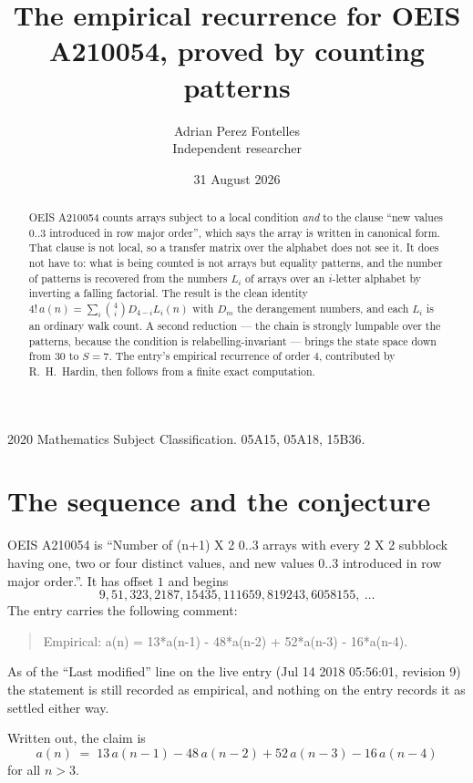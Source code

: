 \documentclass[11pt,a4paper]{article}
\title{The empirical recurrence for OEIS A210054, proved by counting patterns}
\author{Adrian Perez Fontelles\\ \small Independent researcher}
\date{31 August 2026}
\theoremstyle{plain}
\theoremstyle{definition}
\begin{document}
\maketitle

\begin{abstract}
OEIS A210054 counts arrays subject to a local condition \emph{and} to the clause ``new values
$0..3$ introduced in row major order'', which says the array is written in canonical
form. That clause is not local, so a transfer matrix over the alphabet does not see it. It
does not have to: what is being counted is not arrays but equality patterns, and the number
of patterns is recovered from the numbers $L_i$ of arrays over an $i$-letter alphabet by
inverting a falling factorial. The result is the clean identity
$4!\,a(n)=\sum_i\binom{4}{i}D_{4-i}L_i(n)$ with $D_m$ the derangement numbers,
and each $L_i$ is an ordinary walk count. A second reduction --- the chain is strongly
lumpable over the patterns, because the condition is relabelling-invariant --- brings the
state space down from $30$ to $S=7$. The entry's empirical recurrence of order
$4$, contributed by R.~H.~Hardin, then follows from a finite exact computation.
\end{abstract}

\noindent\small 2020 Mathematics Subject Classification. 05A15, 05A18, 15B36.\normalsize

\section{The sequence and the conjecture}

OEIS A210054 is ``Number of (n+1) X 2 0..3 arrays with every 2 X 2 subblock having one, two or four distinct values, and new values 0..3 introduced in row major order.''. It has offset $1$ and begins
\[
9, 51, 323, 2187, 15435, 111659, 819243, 6058155,\ \dots
\]
The entry carries the following comment:
\begin{quote}\small
Empirical: a(n) = 13*a(n-1) - 48*a(n-2) + 52*a(n-3) - 16*a(n-4).
\end{quote}
As of the ``Last modified'' line on the live entry (Jul 14 2018 05:56:01, revision 9) the statement is
still recorded as empirical, and nothing on the entry records it as settled either way.

Written out, the claim is
\begin{equation}\label{eq:conj}
a(n)\;=\;13\,a(n-1) - 48\,a(n-2) + 52\,a(n-3) - 16\,a(n-4)
\end{equation}
for all $n>3$.
\end{document}
